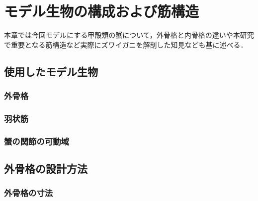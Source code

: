 \newpage
\section{モデル生物の構成および筋構造}
本章では今回モデルにする甲殻類の蟹について，外骨格と内骨格の違いや本研究で重要となる筋構造など実際にズワイガニを解剖した知見なども基に述べる．
\subsection{使用したモデル生物}
\subsubsection{外骨格}
\subsubsection{羽状筋}
\subsubsection{蟹の関節の可動域}
\subsection{外骨格の設計方法}
\subsubsection{外骨格の寸法}
